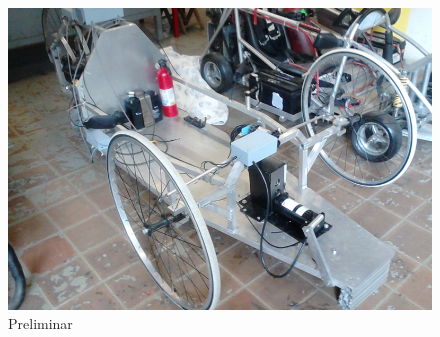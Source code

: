 \begin{figure}
\centering
\includegraphics[width=4.5in]{fotos/preliminar}
\caption{Preliminar}
\label{fig:fotos:preliminar}
\end{figure}

